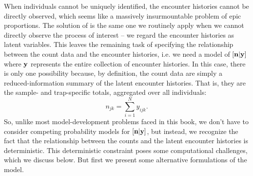 When individuals cannot be uniquely identified, the encounter histories cannot
be directly observed, which seems like a massively insurmountable
problem of epic proportions.
 The solution of \citet{chandler_royle:2012} is the same one we routinely apply when we
cannot directly observe the process of interest -- we regard the
encounter histories as latent variables. This leaves the remaining
task of specifying the relationship between the count data and
the encounter histories, i.e. we need a model of $[{\bf n}|{\bf y}]$
where $\bf y$ represents the entire collection of encounter
histories. In this case, there is only one possibility because, by
definition, the count data are simply a
reduced-information summary of the latent encounter histories. That
is, they are the sample- and trap-specific totals, aggregated over all
individuals:
\begin{equation}
n_{jk} = \sum_{i=1}^{N} y_{ijk}.
\label{unmarked.eq.ny}
\end{equation}
So, unlike most model-development problems faced in this book, we
don't have to consider competing probability models for
$[{\bf n}|{\bf y}]$, but instead, we recognize the fact that the
relationship between the counts and the latent encounter histories is
deterministic. This deterministic constraint poses some computational
challenges, which we discuss below. But first we present some
alternative formulations of the model.


